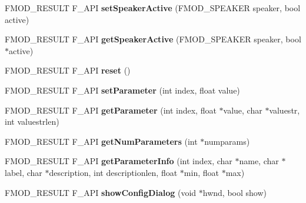 \begin{DoxyCompactItemize}
\item 
\hypertarget{class_f_m_o_d_1_1_d_s_p_ac8b9504840c96548c383fdead268f10c}{F\-M\-O\-D\-\_\-\-R\-E\-S\-U\-L\-T F\-\_\-\-A\-P\-I {\bfseries set\-Speaker\-Active} (F\-M\-O\-D\-\_\-\-S\-P\-E\-A\-K\-E\-R speaker, bool active)}\label{class_f_m_o_d_1_1_d_s_p_ac8b9504840c96548c383fdead268f10c}

\item 
\hypertarget{class_f_m_o_d_1_1_d_s_p_ace16e6d02305b7d39cb626abb944d054}{F\-M\-O\-D\-\_\-\-R\-E\-S\-U\-L\-T F\-\_\-\-A\-P\-I {\bfseries get\-Speaker\-Active} (F\-M\-O\-D\-\_\-\-S\-P\-E\-A\-K\-E\-R speaker, bool $\ast$active)}\label{class_f_m_o_d_1_1_d_s_p_ace16e6d02305b7d39cb626abb944d054}

\item 
\hypertarget{class_f_m_o_d_1_1_d_s_p_ae475150cbc68d5ad5e5be5791ec3961a}{F\-M\-O\-D\-\_\-\-R\-E\-S\-U\-L\-T F\-\_\-\-A\-P\-I {\bfseries reset} ()}\label{class_f_m_o_d_1_1_d_s_p_ae475150cbc68d5ad5e5be5791ec3961a}

\item 
\hypertarget{class_f_m_o_d_1_1_d_s_p_abb8a3ad932d399703103da1b752c4fad}{F\-M\-O\-D\-\_\-\-R\-E\-S\-U\-L\-T F\-\_\-\-A\-P\-I {\bfseries set\-Parameter} (int index, float value)}\label{class_f_m_o_d_1_1_d_s_p_abb8a3ad932d399703103da1b752c4fad}

\item 
\hypertarget{class_f_m_o_d_1_1_d_s_p_aae915b3c0d956419aeed08c2aa3000e2}{F\-M\-O\-D\-\_\-\-R\-E\-S\-U\-L\-T F\-\_\-\-A\-P\-I {\bfseries get\-Parameter} (int index, float $\ast$value, char $\ast$valuestr, int valuestrlen)}\label{class_f_m_o_d_1_1_d_s_p_aae915b3c0d956419aeed08c2aa3000e2}

\item 
\hypertarget{class_f_m_o_d_1_1_d_s_p_aba45842920caedf11c614d77aa028ab3}{F\-M\-O\-D\-\_\-\-R\-E\-S\-U\-L\-T F\-\_\-\-A\-P\-I {\bfseries get\-Num\-Parameters} (int $\ast$numparams)}\label{class_f_m_o_d_1_1_d_s_p_aba45842920caedf11c614d77aa028ab3}

\item 
\hypertarget{class_f_m_o_d_1_1_d_s_p_a116d65e165bac32512ddbb7c188bf3a5}{F\-M\-O\-D\-\_\-\-R\-E\-S\-U\-L\-T F\-\_\-\-A\-P\-I {\bfseries get\-Parameter\-Info} (int index, char $\ast$name, char $\ast$label, char $\ast$description, int descriptionlen, float $\ast$min, float $\ast$max)}\label{class_f_m_o_d_1_1_d_s_p_a116d65e165bac32512ddbb7c188bf3a5}

\item 
\hypertarget{class_f_m_o_d_1_1_d_s_p_a9a77cb36dbbc0bb053b42eb4d2dcd1f7}{F\-M\-O\-D\-\_\-\-R\-E\-S\-U\-L\-T F\-\_\-\-A\-P\-I {\bfseries show\-Config\-Dialog} (void $\ast$hwnd, bool show)}\label{class_f_m_o_d_1_1_d_s_p_a9a77cb36dbbc0bb053b42eb4d2dcd1f7}


\end{DoxyCompactItemize}
